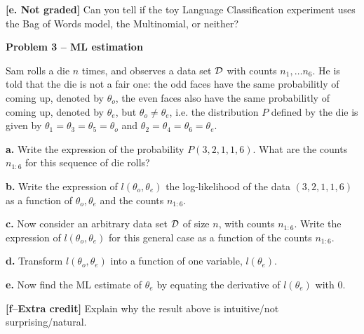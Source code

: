 \documentclass[10pt]{article}
\newcommand{\comment}[1]{}
\newcommand{\dataset}{{\cal D}}
\begin{document}
{\bf [e. Not graded]} Can you tell if the toy Language Classification experiment uses the Bag of Words model, the Multinomial, or neither?
 


{\bf Problem 3 -- ML estimation }

Sam rolls a die $n$ times, and observes a data set $\dataset$ with
counts $n_1,\ldots n_6$. He is told that the die is not a fair one:
the odd faces have the same probabilitly of coming up, denoted by
$\theta_o$, the even faces also have the same probabilitly of coming
up, denoted by $\theta_e$, but $\theta_o\neq \theta_e$, i.e. the
distribution $P$ defined by the die is given by
$\theta_1=\theta_3=\theta_5=\theta_o$ and
$\theta_2=\theta_4=\theta_6=\theta_e$.

{\bf a.}  Write the expression of the probability $P(3, 2, 1, 1, 6)$. What are the counts $n_{1:6}$ for this sequence of die rolls?

{\bf b.} Write the expression of $l(\theta_o,\theta_e)$ the
log-likelihood of the data $(3,2,1,1,6)$ as a function of
$\theta_o,\theta_e$ and the counts $n_{1:6}$.

{\bf c.} Now consider an arbitrary data set $\dataset$ of size $n$, with counts $n_{1:6}$. Write the expression of $l(\theta_o,\theta_e)$ for this general case as a function of the counts $n_{1:6}$. 

{\bf d.} Transform $l(\theta_o,\theta_e)$ into a function of one
variable, $l(\theta_e)$.

{\bf e.} Now find the ML estimate of $\theta_e$ by equating the
derivative of $l(\theta_e)$ with 0. 

{\bf [f--Extra credit]} Explain why the result above is intuitive/not
surprising/natural.

\comment{
{\bf [Problem 4 -- A tricky ML estimation -- Extra credit]}

You record $n$ samples from a Poisson distribution with rate
parameter $\lambda$. However, due to a really poor choice of variable
(namely, boolean), all that ends up being recorded is whether each
sample was zero or non-zero. Using only this information, and your
knowlege of maximum likelihood estimation, what is your estimate of
the rate parameter $\lambda$?}
\end{document}
